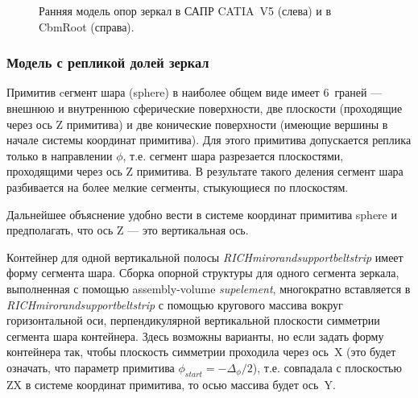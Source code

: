 \begin{figure}[H]
\begin{minipage}[b]{0.49\textwidth}
\end{minipage}
\caption{Ранняя модель опор зеркал в САПР CATIA~V5 (слева) и в CbmRoot (справа).}
\label{fig:SmallFrameCADandMC}
\end{figure}

\subsubsection{Модель с репликой долей зеркал}\label{sec:secModelWithReplMirrors}

Примитив cегмент шара (sphere) в наиболее общем виде имеет 6~граней --- внешнюю и внутреннюю сферические поверхности, две плоскости (проходящие через ось Z примитива) и две конические поверхности (имеющие вершины в начале системы координат примитива).
Для этого примитива допускается реплика только в направлении $\phi$, т.е. сегмент шара разрезается плоскостями, проходящими через ось Z примитива. В результате такого деления сегмент шара разбивается на более мелкие сегменты, стыкующиеся по плоскостям.

Дальнейшее объяснение удобно вести в системе координат примитива sphere и предполагать, что ось Z --- это вертикальная ось.

Контейнер для одной вертикальной полосы
\textit{RICH\textunderscore miror\textunderscore and\textunderscore support\textunderscore belt\textunderscore strip}
имеет форму сегмента шара.
Сборка опорной структуры для одного сегмента зеркала, выполненная с помощью assembly-volume \textit{sup\textunderscore element}, многократно вставляется в
\textit{RICH\textunderscore miror\textunderscore and\textunderscore support\textunderscore belt\textunderscore strip}
с помощью кругового массива вокруг горизонтальной оси, перпендикулярной вертикальной плоскости симметрии сегмента шара контейнера. Здесь возможны варианты, но если задать форму контейнера так, чтобы плоскость симметрии проходила через ось~X (это будет означать, что параметр примитива $\phi_{start} = -\Delta_{\phi}/2$), т.е. совпадала с плоскостью ZX в системе координат примитива, то осью массива будет ось~Y.

